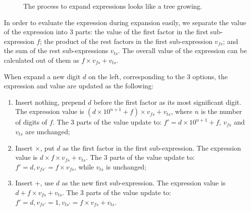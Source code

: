 \documentclass[b5paper]{article}
\begin{document}
\begin{figure}[htbp]
\centering
{}
\caption{The process to expand expressions looks like a tree growing.}
\end{figure}

In order to evaluate the expression during expansion easily, we separate the value of the expression into 3 parts: the value of the first factor in the first sub-expression $f$; the product of the rest factors in the first sub-expression $v_{fs}$; and the sum of the rest sub-expressions $v_{ts}$. The overall value of the expression can be calculated out of them as $f \times v_{fs} + v_{ts}$.

When expand a new digit $d$ on the left, corresponding to the 3 options, the expression and value are updated as the following:

\begin{enumerate}
\item Insert nothing, prepend $d$ before the first factor as its most significant digit. The expression value is $(d \times 10^{n+1} + f) \times v_{fs} + v_{ts}$, where $n$ is the number of digits of $f$. The 3 parts of the value update to: $f' = d \times 10^{n+1} + f$, $v_{fs}$ and $v_{ts}$ are unchanged;

\item Insert $\times$, put $d$ as the first factor in the first sub-expression. The expression value is $d \times f \times v_{fs} + v_{ts}$. The 3 parts of the value update to: $f' = d, v_{fs'} = f \times v_{fs}$, while $v_{ts}$ is unchanged;

\item Insert +, use $d$ as the new first sub-expression. The expression value is $d + f \times v_{fs} + v_{ts}$. The 3 parts of the value update to: $f' = d, v_{fs'} = 1, v_{ts'} = f \times v_{fs} + v_{ts}$.
\end{enumerate}
\end{document}
